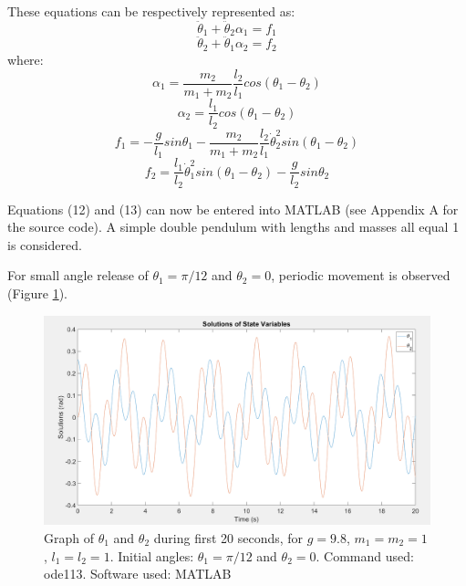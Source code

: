 \documentclass[a4paper,12pt]{article}
\begin{document}
These equations can be respectively represented as:
\begin{equation}
    \ddot\theta_1  + \ddot\theta_2\alpha_1=f_1
\end{equation}
\begin{equation}
    \ddot\theta_2  + \ddot\theta_1\alpha_2=f_2
\end{equation}
where:
\begin{equation}
    \alpha_1 = \frac{m_2}{m_1+m_2}\frac{l_2}{l_1}cos(\theta_1-\theta_2)
\end{equation}
\begin{equation}
    \alpha_2 = \frac{l_1}{l_2}cos(\theta_1-\theta_2)
\end{equation}
\begin{equation}
    f_1= -\frac{g}{l_1}sin\theta_1 -\frac{m_2}{m_1+m_2}\frac{l_2}{l_1}\dot\theta_2^2sin(\theta_1-\theta_2)
\end{equation}
\begin{equation}
    f_2=\frac{l_1}{l_2}\dot\theta_1^2sin(\theta_1-\theta_2) - \frac{g}{l_2}sin\theta_2
\end{equation}

Equations (12) and (13) can now be entered into MATLAB (see Appendix A for the source code). A simple double pendulum with lengths and masses all equal 1 is considered.

For small angle release of $\theta_1 = \pi/12$ and $\theta_2=0$, periodic movement is observed (Figure \ref{fig:pi12}).
\pagebreak

\begin{figure}[H]
    \centering
    \includegraphics[width=.9\textwidth]{pi12}
    \caption{Graph of $\theta_1$ and $\theta_2$ during first 20 seconds, for $g = 9.8$, $m_1 = m_2 = 1$, $l_1 = l_2 = 1$. Initial angles: $\theta_1 = \pi/12$ and $\theta_2=0$. Command used: ode113. Software used: MATLAB}
    \label{fig:pi12}
\end{figure}
\end{document}
